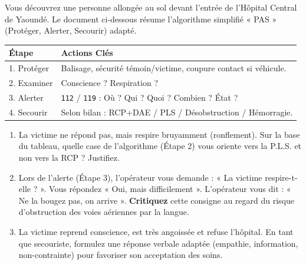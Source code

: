 \documentclass[11pt]{article}
\begin{document}
\begin{exercice}
Vous découvrez une personne allongée au sol devant l'entrée de l'Hôpital Central de Yaoundé. Le document ci-dessous résume l'algorithme simplifié « PAS » (Protéger, Alerter, Secourir) adapté.
\begin{center}
\begin{tabular}{|p{3.5cm}|p{6cm}|}
\hline
\textbf{Étape} & \textbf{Actions Clés} \\
\hline
1. Protéger & Balisage, sécurité témoin/victime, coupure contact si véhicule. \\
\hline
2. Examiner & Conscience ? Respiration ? \\
\hline
3. Alerter & \texttt{112} / \texttt{119} : Où ? Qui ? Quoi ? Combien ? État ? \\
\hline
4. Secourir & Selon bilan : RCP+DAE / PLS / Désobstruction / Hémorragie. \\
\hline
\end{tabular}
\end{center}
\begin{enumerate}
    \item La victime ne répond pas, mais respire bruyamment (ronflement). Sur la base du tableau, quelle case de l'algorithme (Étape 2) vous oriente vers la P.L.S. et non vers la RCP ? Justifiez.
    \item Lors de l'alerte (Étape 3), l'opérateur vous demande : « La victime respire-t-elle ? ». Vous répondez « Oui, mais difficilement ». L'opérateur vous dit : « Ne la bougez pas, on arrive ». \textbf{Critiquez} cette consigne au regard du risque d'obstruction des voies aériennes par la langue.
    \item La victime reprend conscience, est très angoissée et refuse l'hôpital. En tant que secouriste, formulez une réponse verbale adaptée (empathie, information, non-contrainte) pour favoriser son acceptation des soins.
\end{enumerate}
\end{exercice}
\end{document}
